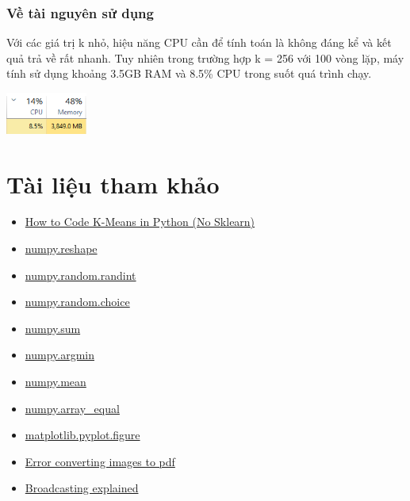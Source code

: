 \documentclass{article}
\begin{document}
\subsubsection{Về tài nguyên sử dụng}
Với các giá trị k nhỏ, hiệu năng CPU cần để tính toán là không đáng kể và kết quả trả về rất nhanh. Tuy nhiên trong trường hợp k = 256 với 100 vòng lặp, máy tính sử dụng khoảng 3.5GB RAM và 8.5\% CPU trong suốt quá trình chạy. \par

\centerline{\includegraphics[width=0.2\textwidth]{image/performance.png}}
\newpage
\section{Tài liệu tham khảo}
\begin{itemize}
    \item \href{https://youtu.be/uLs-EYUpGAw?t=231}{How to Code K-Means in Python (No Sklearn)}
    \item \href{https://numpy.org/doc/stable/reference/generated/numpy.reshape.html}{numpy.reshape}
    \item \href{https://numpy.org/doc/stable/reference/random/generated/numpy.random.randint.html}{numpy.random.randint}
    \item \href{https://numpy.org/doc/stable/reference/random/generated/numpy.random.choice.html}{numpy.random.choice}
    \item \href{https://numpy.org/doc/stable/reference/generated/numpy.sum.html}{numpy.sum}
    \item \href{https://numpy.org/doc/stable/reference/generated/numpy.argmin.html}{numpy.argmin}
    \item \href{https://numpy.org/doc/stable/reference/generated/numpy.mean.html}{numpy.mean}
    \item \href{https://numpy.org/doc/stable/reference/generated/numpy.array_equal.html}{numpy.array\_equal}
    \item \href{https://matplotlib.org/stable/api/_as_gen/matplotlib.pyplot.figure.html}{matplotlib.pyplot.figure}
    \item \href{https://www.reddit.com/r/learnpython/comments/4g4dru/error_converting_images_to_pdf/}{Error converting images to pdf}
    \item \href{https://numpy.org/doc/stable/user/basics.broadcasting.html}{Broadcasting explained}
\end{itemize}
\end{document}
